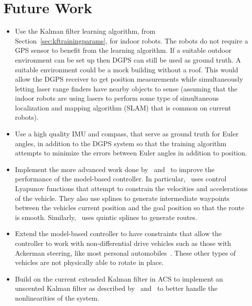 \chapter{Future Work}%
\label{ch:futurework}

\begin{itemize}
\item Use the Kalman filter learning algorithm, from Section~\ref{sec:kftrainingparams}, for indoor robots.
      The robots do not require a GPS sensor to benefit from the learning algorithm.
      If a suitable outdoor environment can be set up then DGPS can still be used as ground truth.
      A suitable environment could be a mock building without a roof.
      This would allow the DGPS receiver to get position measurements while simultaneously letting laser range finders have nearby objects to sense (assuming that the indoor robots are using lasers to perform some type of simultaneous localization and mapping algorithm (SLAM) that is common on current robots).
\item Use a high quality IMU and compass, that serve as ground truth for Euler angles, in addition to the DGPS system so that the training algorithm attempts to minimize the errors between Euler angles in addition to position.
\item Implement the more advanced work done by~\cite{Lapierre06} and~\cite{Gulati08} to improve the performance of the model-based controller.
      In particular,~\cite{Gulati08} uses control Lyapunov functions that attempt to constrain the velocities and accelerations of the vehicle.
      They also use splines to generate intermediate waypoints between the vehicles current position and the goal position so that the route is smooth.
      Similarly,~\cite{Burgard09} uses quintic splines to generate routes.
\item Extend the model-based controller to have constraints that allow the controller to work with non-differential drive vehicles such as those with Ackerman steering, like most personal automobiles~\cite{Shiller91dynamicmotion}.
      These other types of vehicles are not physically able to rotate in place.
\item Build on the current extended Kalman filter in ACS to implement an unscented Kalman filter as described by~\cite{ThrunProbRobots06} and~\cite{Orderud05} to better handle the nonlinearities of the system.
\end{itemize}
